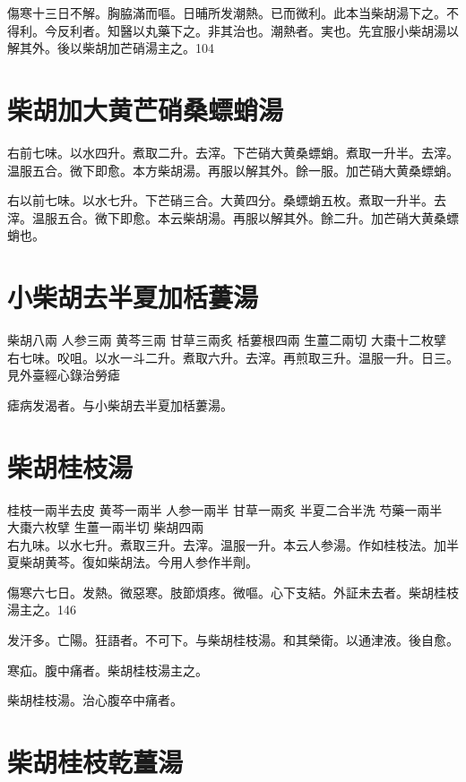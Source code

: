 傷寒十三日不解。胸脇滿而嘔。日晡所发潮熱{\khaaitp 。已}而微利。此本当柴胡湯下之。不得利。今反利者。知醫以丸藥下之。非其治也。潮熱者。実也。先宜服小柴胡湯以解其外。後以柴胡加芒硝湯主之。104

\section{柴胡加大黄芒硝桑螵蛸湯}

右前七味。以水四升。煮取二升。去滓。下芒硝大黄桑螵蛸。煮取一升半。去滓。温服五合。微下即愈。本方柴胡湯。再服以解其外。餘一服。加芒硝大黄桑螵蛸。{\yuhan}

右以前七味。以水七升。下芒硝三合。大黄四分。桑螵蛸五枚。煮取一升半。去滓。温服五合。微下即愈。本云柴胡湯。再服以解其外。餘二升。加芒硝大黄桑螵蛸也。{\yifang}

\section{小柴胡去半夏加栝蔞湯}

柴胡{\scriptsize 八兩} 人参{\scriptsize 三兩} 黄芩{\scriptsize 三兩} 甘草{\scriptsize 三兩炙} 栝蔞根{\scriptsize 四兩} 生薑{\scriptsize 二兩切} 大棗{\scriptsize 十二枚擘}\\
右七味。㕮咀。以水一斗二升。煮取六升。去滓。再煎取三升。温服一升。日三。{\scriptsize 見外臺經心錄治勞瘧}

瘧病发渴者。与小柴胡去半夏加栝蔞湯。

\section{柴胡桂枝湯}

桂枝{\scriptsize 一兩半去皮} 黄芩{\scriptsize 一兩半} 人参{\scriptsize 一兩半} 甘草{\scriptsize 一兩炙} 半夏{\scriptsize 二合半洗} 芍藥{\scriptsize 一兩半} 大棗{\scriptsize 六枚擘} 生薑{\scriptsize 一兩半切} 柴胡{\scriptsize 四兩}\\
右九味。以水七升。煮取三升。去滓。温服一升。本云人参湯。作如桂枝法。加半夏柴胡黄芩。復如柴胡法。今用人参作半劑。

傷寒六七日。发熱。微惡寒。肢節煩疼。微嘔。心下支結。外証未去者。柴胡桂枝湯主之。146

发汗多。亡陽。狂語者。不可下。与柴胡桂枝湯。和其榮衛。以通津液。後自愈。

寒疝。腹中痛者。柴胡桂枝湯主之。{\wuben}

柴胡桂枝湯。治心腹卒中痛者。{\dengben}

\section{柴胡桂枝乾薑湯}

